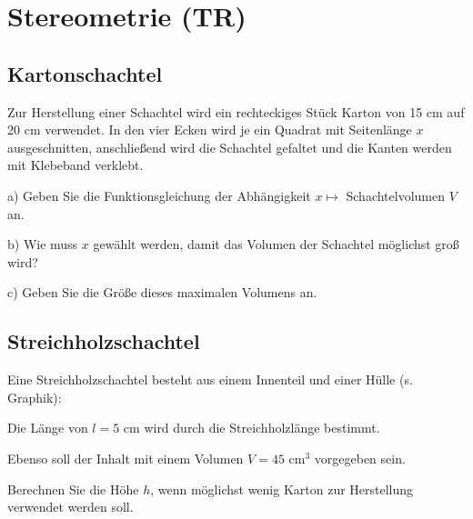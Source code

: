\newpage\section{Stereometrie (TR)}

\subsection{Kartonschachtel}
Zur Herstellung einer Schachtel wird ein rechteckiges
Stück Karton von 15 cm auf 20 cm verwendet. In
den vier Ecken wird je ein Quadrat mit Seitenlänge $x$
ausgeschnitten, anschließend wird die Schachtel
gefaltet und die Kanten werden mit Klebeband
verklebt.

a)
Geben Sie die Funktionsgleichung der Abhängigkeit $x \mapsto$ Schachtelvolumen $V$ an.

b)
Wie muss $x$ gewählt werden, damit das Volumen
der Schachtel möglichst groß wird?

c)
Geben Sie die Größe dieses maximalen Volumens
an.


\subsection{Streichholzschachtel}

Eine Streichholzschachtel besteht aus einem Innenteil und einer Hülle
(s. Graphik):


Die Länge von $l = 5 \text{ cm}$ wird durch die Streichholzlänge
bestimmt.

Ebenso soll der Inhalt mit einem Volumen $V = 45\text{ cm}^3$
vorgegeben sein.

Berechnen Sie die Höhe $h$, wenn möglichst wenig Karton zur
Herstellung verwendet werden soll.

